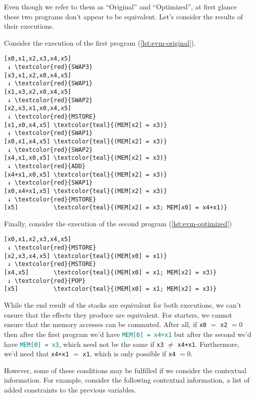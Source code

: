 Even though we refer to them as ``Original'' and ``Optimized'', at first glance these 
two programs don't appear to be equivalent. Let's consider the results of their
executions.

Consider the execution of the first program (\ref{lst:evm-original}).

\begin{Verbatim}[commandchars=\\\{\}]
[x0,x1,x2,x3,x4,x5]
 ↓ \textcolor{red}{SWAP3}
[x3,x1,x2,x0,x4,x5]
 ↓ \textcolor{red}{SWAP1}
[x1,x3,x2,x0,x4,x5]
 ↓ \textcolor{red}{SWAP2}
[x2,x3,x1,x0,x4,x5]
 ↓ \textcolor{red}{MSTORE}
[x1,x0,x4,x5] \textcolor{teal}{(MEM[x2] = x3)}
 ↓ \textcolor{red}{SWAP1}
[x0,x1,x4,x5] \textcolor{teal}{(MEM[x2] = x3)}
 ↓ \textcolor{red}{SWAP2}
[x4,x1,x0,x5] \textcolor{teal}{(MEM[x2] = x3)}
 ↓ \textcolor{red}{ADD}
[x4+x1,x0,x5] \textcolor{teal}{(MEM[x2] = x3)}
 ↓ \textcolor{red}{SWAP1}
[x0,x4+x1,x5] \textcolor{teal}{(MEM[x2] = x3)}
 ↓ \textcolor{red}{MSTORE}
[x5]          \textcolor{teal}{(MEM[x2] = x3; MEM[x0] = x4+x1)}
\end{Verbatim}

Finally, consider the execution of the second program (\ref{lst:evm-optimized})

\begin{Verbatim}[commandchars=\\\{\}]
[x0,x1,x2,x3,x4,x5]
 ↓ \textcolor{red}{MSTORE}
[x2,x3,x4,x5] \textcolor{teal}{(MEM[x0] = x1)}
 ↓ \textcolor{red}{MSTORE}
[x4,x5]       \textcolor{teal}{(MEM[x0] = x1; MEM[x2] = x3)}
 ↓ \textcolor{red}{POP}
[x5]          \textcolor{teal}{(MEM[x0] = x1; MEM[x2] = x3)}
\end{Verbatim}

While the end result of the stacks are equivalent for both executions, we can't ensure that the
effects they produce are equivalent. For starters, we cannot ensure that the memory accesses can
be commuted. After all, if \verb|x0| $=$ \verb|x2| $= 0$ then after the first program we'd have
{\textcolor{teal}{\texttt{MEM[0]~=~x4+x1}}} but after the second we'd have 
{\textcolor{teal}{\texttt{MEM[0]~=~x3}}}, which need not be the same if \verb|x3| $\ne$ \verb|x4+x1|.
Furthermore, we'd need that \verb|x4+x1| $=$ \verb|x1|, which is only possible if \verb|x4| $= 0$.

However, some of these conditions may be fulfilled if we consider the contextual information.
For example, consider the following contextual information, a list of added constraints to the
previous variables.

